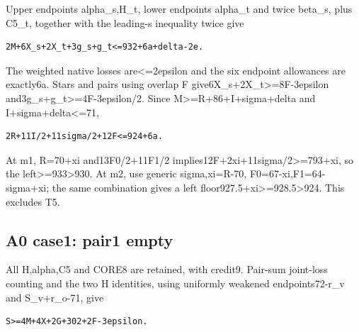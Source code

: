 \documentclass[10pt,a4paper]{article}
\theoremstyle{definition}
\begin{document}
Upper endpoints alpha\_\allowbreak{}s,\allowbreak{}H\_\allowbreak{}t,\allowbreak{} lower endpoints alpha\_\allowbreak{}t and twice
beta\_\allowbreak{}s,\allowbreak{} plus C5\_\allowbreak{}t,\allowbreak{} together with the leading-s inequality twice give

\begin{lstlisting}
2M+6X_s+2X_t+3g_s+g_t<=932+6a+delta-2e.
\end{lstlisting}

The weighted native losses are\textless=\allowbreak{}2epsilon and the six endpoint
allowances are exactly6a. Stars and pairs using overlap F
give6X\_\allowbreak{}s+\allowbreak{}2X\_\allowbreak{}t\textgreater=\allowbreak{}8F-3epsilon
and3g\_\allowbreak{}s+\allowbreak{}g\_\allowbreak{}t\textgreater=\allowbreak{}4F-3epsilon/2. Since
M\textgreater=\allowbreak{}R+\allowbreak{}86+\allowbreak{}I+\allowbreak{}sigma+\allowbreak{}delta and I+\allowbreak{}sigma+\allowbreak{}delta\textless=\allowbreak{}71,\allowbreak{}

\begin{lstlisting}
2R+11I/2+11sigma/2+12F<=924+6a.
\end{lstlisting}

At m1,\allowbreak{} R=\allowbreak{}70+\allowbreak{}xi and13F0/2+\allowbreak{}11F1/2
implies12F+\allowbreak{}2xi+\allowbreak{}11sigma/2\textgreater=\allowbreak{}793+\allowbreak{}xi,\allowbreak{} so the
left\textgreater=\allowbreak{}933\textgreater930. At m2,\allowbreak{} use generic sigma,\allowbreak{}xi=\allowbreak{}R-70,\allowbreak{}
F0=\allowbreak{}67-xi,\allowbreak{}F1=\allowbreak{}64-sigma+\allowbreak{}xi; the same combination gives a left
floor927.5+\allowbreak{}xi\textgreater=\allowbreak{}928.5\textgreater924. This excludes T5.

\hypertarget{a0-case1-pair1-empty}{%
\subsection{A0 case1: pair1 empty}\label{a0-case1-pair1-empty}}

All H,\allowbreak{}alpha,\allowbreak{}C5 and CORE8 are retained,\allowbreak{} with credit9. Pair-sum joint-loss
counting and the two H identities,\allowbreak{} using uniformly weakened
endpoints72-r\_\allowbreak{}v and S\_\allowbreak{}v+\allowbreak{}r\_\allowbreak{}o-71,\allowbreak{} give

\begin{lstlisting}
S>=4M+4X+2G+302+2F-3epsilon.
\end{lstlisting}
\end{document}
